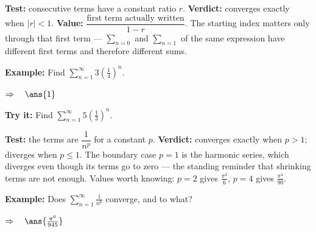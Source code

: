 \documentclass[12pt]{article}
\begin{document}


\begin{formulabox}
\textbf{Test:} consecutive terms have a constant ratio $r$. \textbf{Verdict:} converges exactly when $|r| < 1$. \textbf{Value:} $\dfrac{\text{first term actually written}}{1 - r}$. The starting index matters only through that first term --- $\sum_{n=0}$ and $\sum_{n=1}$ of the same expression have different first terms and therefore different sums.
\end{formulabox}

\begin{examplebox}
\textbf{Example:} \quad Find $\displaystyle\sum_{n=1}^{\infty} 3\left(\frac{1}{4}\right)^{n}$.

$\Rightarrow\quad \ans{1}$
\end{examplebox}

\begin{tryitbox}
\textbf{Try it:} \quad Find $\displaystyle\sum_{n=1}^{\infty} 5\left(\frac{1}{3}\right)^{n}$.\\[2pt]
\end{tryitbox}


\begin{formulabox}
\textbf{Test:} the terms are $\dfrac{1}{n^{p}}$ for a constant $p$. \textbf{Verdict:} converges exactly when $p > 1$; diverges when $p \le 1$. The boundary case $p = 1$ is the harmonic series, which diverges even though its terms go to zero --- the standing reminder that shrinking terms are not enough. Values worth knowing: $p = 2$ gives $\frac{\pi^{2}}{6}$, $p = 4$ gives $\frac{\pi^{4}}{90}$.
\end{formulabox}

\begin{examplebox}
\textbf{Example:} \quad Does $\displaystyle\sum_{n=1}^{\infty}\frac{1}{n^{6}}$ converge, and to what?

$\Rightarrow\quad \ans{\frac{\pi^{6}}{945}}$
\end{examplebox}
\end{document}
